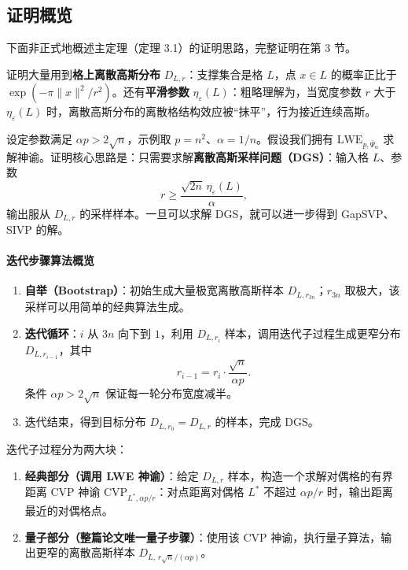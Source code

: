 \documentclass[11pt,a4paper]{article}
\newcommand{\Psibar}{\overline{\Psi}}
\begin{document}
\subsection{证明概览}

下面非正式地概述主定理（定理 3.1）的证明思路，完整证明在第 3 节。

证明大量用到\textbf{格上离散高斯分布} $D_{L,r}$：支撑集合是格 $L$，点 $x\in L$ 的概率正比于 $\exp(-\pi\lVert x\rVert^{2}/r^{2})$。还有\textbf{平滑参数} $\eta_{\varepsilon}(L)$：粗略理解为，当宽度参数 $r$ 大于 $\eta_{\varepsilon}(L)$ 时，离散高斯分布的离散格结构效应被``抹平''，行为接近连续高斯。

设定参数满足 $\alpha p>2\sqrt{n}$，示例取 $p=n^{2}$、$\alpha=1/n$。假设我们拥有 $\mathrm{LWE}_{p,\Psibar_{\alpha}}$ 求解神谕。证明核心思路是：只需要求解\textbf{离散高斯采样问题（DGS）}：输入格 $L$、参数
\[
  r\ge \frac{\sqrt{2n}\,\eta_{\varepsilon}(L)}{\alpha},
\]
输出服从 $D_{L,r}$ 的采样样本。一旦可以求解 DGS，就可以进一步得到 GapSVP、SIVP 的解。

\paragraph*{迭代步骤算法概览}

\begin{enumerate}[label=\arabic*.]
  \item \textbf{自举（Bootstrap）}：初始生成大量极宽离散高斯样本 $D_{L,r_{3n}}$；$r_{3n}$ 取极大，该采样可以用简单的经典算法生成。
  \item \textbf{迭代循环}：$i$ 从 $3n$ 向下到 $1$，利用 $D_{L,r_{i}}$ 样本，调用迭代子过程生成更窄分布 $D_{L,r_{i-1}}$，其中
  \[
    r_{i-1}=r_{i}\cdot\frac{\sqrt{n}}{\alpha p}.
  \]
  条件 $\alpha p>2\sqrt{n}$ 保证每一轮分布宽度减半。
  \item 迭代结束，得到目标分布 $D_{L,r_{0}}=D_{L,r}$ 的样本，完成 DGS。
\end{enumerate}

迭代子过程分为两大块：

\begin{enumerate}[label=(\arabic*)]
  \item \textbf{经典部分（调用 LWE 神谕）}：给定 $D_{L,r}$ 样本，构造一个求解对偶格的有界距离 CVP 神谕 $\mathrm{CVP}_{L^{*},\alpha p/r}$：对点距离对偶格 $L^{*}$ 不超过 $\alpha p/r$ 时，输出距离最近的对偶格点。
  \item \textbf{量子部分（整篇论文唯一量子步骤）}：使用该 CVP 神谕，执行量子算法，输出更窄的离散高斯样本 $D_{L,\,r\sqrt{n}/(\alpha p)}$。
\end{enumerate}
\end{document}
